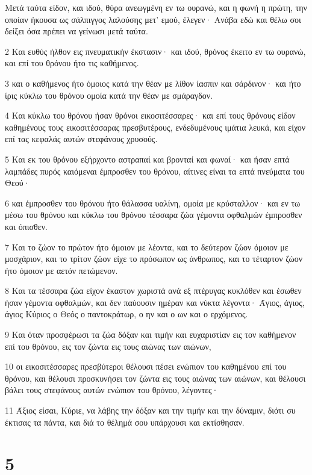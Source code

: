 \par Μετά ταύτα είδον, και ιδού, θύρα ανεωγμένη εν τω ουρανώ, και η φωνή η πρώτη, την οποίαν ήκουσα ως σάλπιγγος λαλούσης μετ' εμού, έλεγεν· Ανάβα εδώ και θέλω σοι δείξει όσα πρέπει να γείνωσι μετά ταύτα.
\par 2 Και ευθύς ήλθον εις πνευματικήν έκστασιν· και ιδού, θρόνος έκειτο εν τω ουρανώ, και επί του θρόνου ήτο τις καθήμενος.
\par 3 και ο καθήμενος ήτο όμοιος κατά την θέαν με λίθον ίασπιν και σάρδινον· και ήτο ίρις κύκλω του θρόνου ομοία κατά την θέαν με σμάραγδον.
\par 4 Και κύκλω του θρόνου ήσαν θρόνοι εικοσιτέσσαρες· και επί τους θρόνους είδον καθημένους τους εικοσιτέσσαρας πρεσβυτέρους, ενδεδυμένους ιμάτια λευκά, και είχον επί τας κεφαλάς αυτών στεφάνους χρυσούς.
\par 5 Και εκ του θρόνου εξήρχοντο αστραπαί και βρονταί και φωναί· και ήσαν επτά λαμπάδες πυρός καιόμεναι έμπροσθεν του θρόνου, αίτινες είναι τα επτά πνεύματα του Θεού·
\par 6 και έμπροσθεν του θρόνου ήτο θάλασσα υαλίνη, ομοία με κρύσταλλον· και εν τω μέσω του θρόνου και κύκλω του θρόνου τέσσαρα ζώα γέμοντα οφθαλμών έμπροσθεν και όπισθεν.
\par 7 Και το ζώον το πρώτον ήτο όμοιον με λέοντα, και το δεύτερον ζώον όμοιον με μοσχάριον, και το τρίτον ζώον είχε το πρόσωπον ως άνθρωπος, και το τέταρτον ζώον ήτο όμοιον με αετόν πετώμενον.
\par 8 Και τα τέσσαρα ζώα είχον έκαστον χωριστά ανά εξ πτέρυγας κυκλόθεν και έσωθεν ήσαν γέμοντα οφθαλμών, και δεν παύουσιν ημέραν και νύκτα λέγοντα· Άγιος, άγιος, άγιος Κύριος ο Θεός ο παντοκράτωρ, ο ην και ο ων και ο ερχόμενος.
\par 9 Και όταν προσφέρωσι τα ζώα δόξαν και τιμήν και ευχαριστίαν εις τον καθήμενον επί του θρόνου, εις τον ζώντα εις τους αιώνας των αιώνων,
\par 10 οι εικοσιτέσσαρες πρεσβύτεροι θέλουσι πέσει ενώπιον του καθημένου επί του θρόνου, και θέλουσι προσκυνήσει τον ζώντα εις τους αιώνας των αιώνων, και θέλουσι βάλει τους στεφάνους αυτών ενώπιον του θρόνου, λέγοντες·
\par 11 Άξιος είσαι, Κύριε, να λάβης την δόξαν και την τιμήν και την δύναμιν, διότι συ έκτισας τα πάντα, και διά το θέλημά σου υπάρχουσι και εκτίσθησαν.

\chapter{5}

